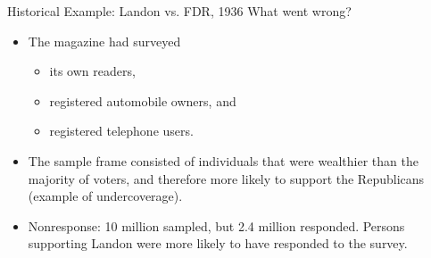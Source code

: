 \documentclass{beamer}
\begin{document}
\begin{frame}{Historical Example: Landon vs. FDR, 1936}
What went wrong?
\vspace{10pt}
\begin{itemize}
\item The magazine had surveyed
\begin{itemize}
\item its own readers,
\item registered automobile owners, and
\item registered telephone users.
\end{itemize}
\vspace{5pt}
\item The sample frame consisted of individuals that were wealthier than the majority of voters, and therefore more likely to support the Republicans (example of undercoverage).  
\vspace{5pt}
\item Nonresponse: 10 million sampled, but 2.4 million responded.  Persons supporting Landon were more likely to have responded to the survey.    
\end{itemize}
\end{frame}
\end{document}
